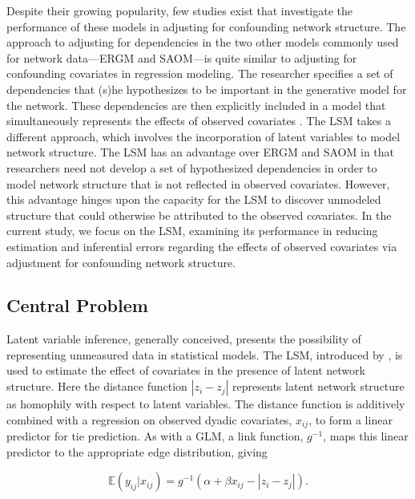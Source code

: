 \documentclass[11pt]{article}
\begin{document}
Despite their growing popularity, few studies exist that investigate the performance of these models in adjusting for confounding network structure.  The approach to adjusting for dependencies in the two other models commonly used for network data---ERGM and SAOM---is quite similar to adjusting for confounding covariates in regression modeling. The researcher specifies a set of dependencies that (s)he hypothesizes to be important in the generative model for the network. These dependencies are then explicitly included in a model that simultaneously represents the effects of observed covariates \citep{cranmer2011pa}. The LSM takes a different approach, which involves the incorporation of latent variables to model network structure. The LSM has an advantage over ERGM and SAOM in that researchers need not develop a set of hypothesized dependencies in order to model network structure that is not reflected in observed covariates. However, this advantage hinges upon the capacity for the LSM to discover unmodeled structure that could otherwise be attributed to the observed covariates. In the current study, we focus on the LSM, examining its performance in reducing estimation and inferential errors regarding the effects of observed covariates via adjustment for confounding network structure.

\subsection{Central Problem}

Latent variable inference, generally conceived, presents the possibility of representing unmeasured data in statistical models. The LSM, introduced by \citet{hoff2002latent}, is used to estimate the effect of covariates in the presence of latent network structure. Here the distance function $|z_i - z_j|$ represents latent network structure as homophily with respect to latent variables.  The distance function is additively combined with a regression on observed dyadic covariates, $x_{ij}$, to form a linear predictor for tie prediction.  As with a GLM, a link function, $g^{-1}$, maps this linear predictor to the appropriate edge distribution, giving

$$\mathbb{E}(y_{ij} | x_{ij}) = g^{-1}(\alpha + \beta x_{ij} - |z_i - z_j|).$$
\end{document}
